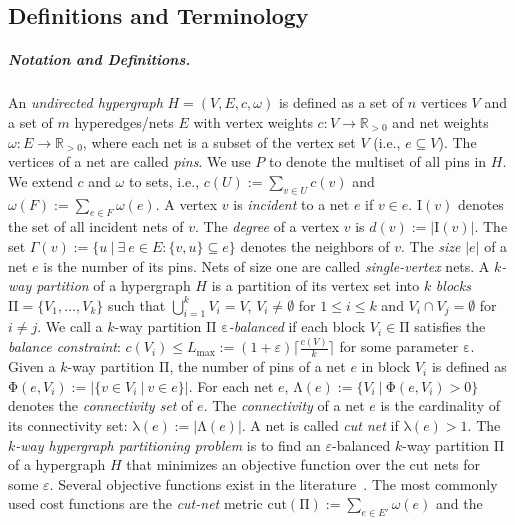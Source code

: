 \subsection{Definitions and Terminology}\label{sec:prelim}
\subparagraph*{Notation and Definitions.}
An \textit{undirected hypergraph} $H=(V,E,c,\omega)$ is defined as a set of $n$ vertices $V$ and a
set of $m$ hyperedges/nets $E$ with vertex weights $c:V \rightarrow \mathbb{R}_{>0}$ and net 
weights $\omega:E \rightarrow \mathbb{R}_{>0}$, where each net is a subset of the vertex set $V$ (i.e., $e \subseteq V$). The vertices of a net are called \emph{pins}.
We use $P$ to denote the multiset of all pins in $H$.
We extend $c$ and $\omega$ to sets, i.e., $c(U) :=\sum_{v\in U} c(v)$ and $\omega(F) :=\sum_{e \in F} \omega(e)$.
A vertex $v$ is \textit{incident} to a net $e$ if $v \in e$. $\mathrm{I}(v)$ denotes the set of all incident nets of $v$. 
The \textit{degree} of a vertex $v$ is $d(v) := |\mathrm{I}(v)|$. 
The set $\Gamma(v) := \{ u~|~\exists~e \in E : \{v,u\} \subseteq e\}$ denotes the neighbors of $v$.
The \textit{size} $|e|$ of a net $e$ is the number of its pins. Nets of size one are called \emph{single-vertex} nets.
A \emph{$k$-way partition} of a hypergraph $H$ is a partition of its vertex set into $k$ \emph{blocks} $\mathrm{\Pi} = \{V_1, \dots, V_k\}$ 
such that $\bigcup_{i=1}^k V_i = V$, $V_i \neq \emptyset $ for $1 \leq i \leq k$ and $V_i \cap V_j = \emptyset$ for $i \neq j$.
We call a $k$-way partition $\mathrm{\Pi}$ \emph{$\mathrm{\varepsilon}$-balanced} if each block $V_i \in \mathrm{\Pi}$ satisfies the \emph{balance constraint}:
$c(V_i) \leq L_{\max} := (1+\varepsilon)\lceil \frac{c(V)}{k} \rceil$ for some parameter $\mathrm{\varepsilon}$. 
Given a $k$-way partition $\mathrm{\Pi}$, the number of pins of a net $e$ in block $V_i$ is defined as
$\mathrm{\Phi}(e,V_i) := |\{v \in V_i~|~v \in e \}|$. 
For each net $e$, $\mathrm{\Lambda}(e) := \{V_i~|~ \mathrm{\Phi}(e, V_i) > 0\}$ denotes the \emph{connectivity set} of $e$.
The \emph{connectivity} of a net $e$ is the cardinality of its connectivity set: $\mathrm{\lambda}(e) := |\mathrm{\Lambda}(e)|$.
A net is called \emph{cut net} if $\mathrm{\lambda}(e) > 1$.
The \emph{$k$-way hypergraph partitioning problem} is to find an $\varepsilon$-balanced $k$-way partition $\mathrm{\Pi}$ of a hypergraph $H$ that
minimizes an objective function over the cut nets for some $\varepsilon$.
Several objective functions exist in the literature~\cite{Alpert19951,Lengauer:1990}.
The most commonly used cost functions are the \emph{cut-net} metric $\text{cut}(\mathrm{\Pi}) := \sum_{e \in E'} \omega(e)$ and the
